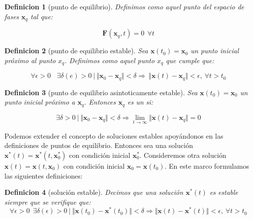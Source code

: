 \documentclass[12pt,a4paper]{article}
\numberwithin{equation}{section}
\numberwithin{figure}{section}
\newcommand{\xn}{\mathbf{x}}
\newcommand{\Fn}{\mathbf{F}}
\newtheorem{definition}{Definicion}[section]
\begin{document}
\begin{definition}[punto de equilibrio]
Definimos  como aquel punto del espacio de fases $\xn_q$ tal que:

\begin{equation}
\Fn (\xn_q,t)= 0  \ \ \forall t
\end{equation}
\end{definition}

\begin{definition}[punto de equilibrio estable]
Sea $\xn(t_0) = \xn_0$ un punto inicial próximo al punto $x_q$. Definimos  como aquel punto $x_q$ que cumple que:

\begin{equation}
\forall \epsilon > 0 \ \ \ \ \exists \delta (e) > 0 \ | \  \Vert \xn_0 - \xn_q \Vert < \delta \Longrightarrow \ \Vert \xn (t) - \xn_q \Vert < \epsilon, \ \forall t >  t_0
\end{equation}
\end{definition}

\begin{definition}[punto de equilibrio asintoticamente estable]
Sea $\xn (t_0) = \xn_0$ un punto inicial próximo a $\xn_q$. Entonces $\xn_q$ es un  si:

\begin{equation}
\exists \delta > 0 \ | \ \Vert \xn_0 - \xn_q \Vert
 < \delta \Longrightarrow \lim_{t \rightarrow \infty} \Vert \xn (t) - \xn_q \Vert = 0
\end{equation}
\end{definition}

Podemos extender el concepto de soluciones estables apoyándonos en las definiciones de puntos de equilibrio. Entonces sea una solución $\xn^* (t) = \xn^* (t,\xn_0^*)$ con condición inicial $\xn_0^*$. Consideremos otra solución $\xn (t) = \xn (t,\xn_0)$ con condición inicial $\xn_0 = \xn (t_0)$. En este marco formulamos las siguientes definiciones:

\begin{definition}[solución estable]
Decimos que una solución $\xn^*(t)$ es estable siempre que se verifique que:
\begin{equation}
\forall \epsilon > 0 \ \ \exists \delta(\epsilon)> 0 \ | \ \Vert \xn (t_0) - \xn^*(t_0) \Vert < \delta \Longrightarrow \Vert \xn (t) - \xn^* (t) \Vert < \epsilon, \ \forall t > t_0
\end{equation}
\end{definition}
\end{document}
